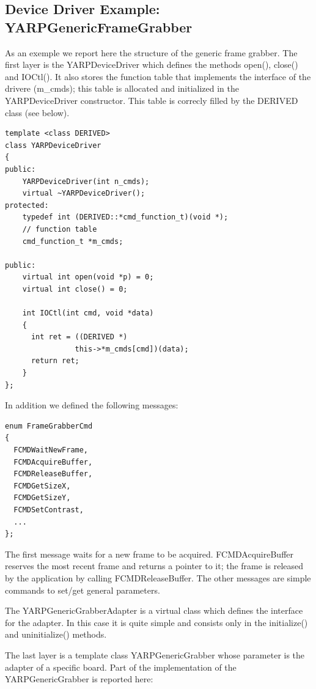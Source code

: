 \subsection{Device Driver Example: YARPGenericFrameGrabber}

As an exemple we report here the structure of the generic frame grabber. The first layer is the YARPDeviceDriver which defines the methods open(), close() and IOCtl(). It also stores the function table that implements the interface of the drivere (m\_cmds); this table is allocated and initialized in the YARPDeviceDriver constructor. This table is correcly filled by the DERIVED class (see below).

{\small \begin{verbatim}
template <class DERIVED>
class YARPDeviceDriver
{
public:
	YARPDeviceDriver(int n_cmds);
	virtual ~YARPDeviceDriver();
protected:
	typedef int (DERIVED::*cmd_function_t)(void *);
	// function table
	cmd_function_t *m_cmds;

public:
	virtual int open(void *p) = 0;
	virtual int close() = 0;

	int IOCtl(int cmd, void *data)
	{
	  int ret = ((DERIVED *)
	            this->*m_cmds[cmd])(data);
	  return ret;
	}
};
\end{verbatim} }

In addition we defined the following messages:

{\small \begin{verbatim}
enum FrameGrabberCmd
{
  FCMDWaitNewFrame,
  FCMDAcquireBuffer,
  FCMDReleaseBuffer,
  FCMDGetSizeX,
  FCMDGetSizeY,
  FCMDSetContrast,
  ...
};
\end{verbatim} }

The first message waits for a new frame to be acquired. FCMDAcquireBuffer reserves the most recent frame and returns a pointer to it; the frame is released by the application by calling FCMDReleaseBuffer. The other messages are simple commands to set/get general parameters.

The YARPGenericGrabberAdapter is a virtual class which defines the interface for the adapter. In this case it is quite simple and consists only in the initialize() and uninitialize() methods. 

The last layer is a template class YARPGenericGrabber whose parameter is the adapter of a specific board. Part of the implementation of the YARPGenericGrabber is reported here:

